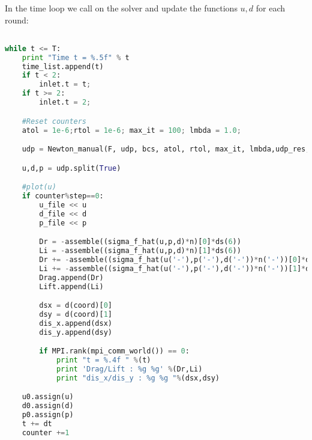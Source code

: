 In the time loop we call on the solver and update the functions $ u,d$ for each round:

\begin{lstlisting}[language=Python]

while t <= T:
    print "Time t = %.5f" % t
    time_list.append(t)
    if t < 2:
        inlet.t = t;
    if t >= 2:
        inlet.t = 2;

    #Reset counters
    atol = 1e-6;rtol = 1e-6; max_it = 100; lmbda = 1.0;

    udp = Newton_manual(F, udp, bcs, atol, rtol, max_it, lmbda,udp_res,VVQ)

    u,d,p = udp.split(True)

    #plot(u)
    if counter%step==0:
        u_file << u
        d_file << d
        p_file << p

        Dr = -assemble((sigma_f_hat(u,p,d)*n)[0]*ds(6))
        Li = -assemble((sigma_f_hat(u,p,d)*n)[1]*ds(6))
        Dr += -assemble((sigma_f_hat(u('-'),p('-'),d('-'))*n('-'))[0]*dS(5))
        Li += -assemble((sigma_f_hat(u('-'),p('-'),d('-'))*n('-'))[1]*dS(5))
        Drag.append(Dr)
        Lift.append(Li)

        dsx = d(coord)[0]
        dsy = d(coord)[1]
        dis_x.append(dsx)
        dis_y.append(dsy)

        if MPI.rank(mpi_comm_world()) == 0:
            print "t = %.4f " %(t)
            print 'Drag/Lift : %g %g' %(Dr,Li)
            print "dis_x/dis_y : %g %g "%(dsx,dsy)

    u0.assign(u)
    d0.assign(d)
    p0.assign(p)
    t += dt
    counter +=1
\end{lstlisting}


	









